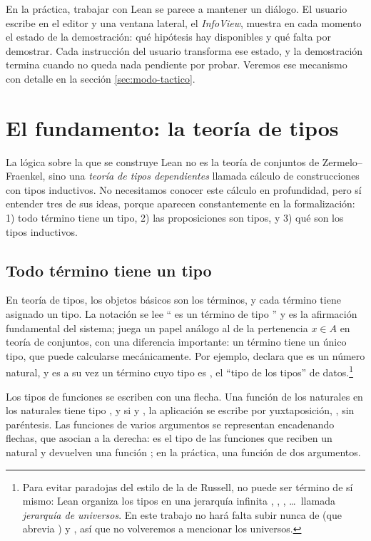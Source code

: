 En la práctica, trabajar con Lean se parece a mantener un diálogo. El usuario escribe en el editor y una ventana lateral, el \emph{InfoView}, muestra en cada momento el estado de la demostración: qué hipótesis hay disponibles y qué falta por demostrar. Cada instrucción del usuario transforma ese estado, y la demostración termina cuando no queda nada pendiente por probar. Veremos ese mecanismo con detalle en la sección \ref{sec:modo-tactico}.
\section{El fundamento: la teoría de tipos}\label{sec:tipos}

La lógica sobre la que se construye Lean no es la teoría de conjuntos de Zermelo--Fraenkel, sino una \emph{teoría de tipos dependientes} llamada cálculo de construcciones con tipos inductivos. No necesitamos conocer este cálculo en profundidad, pero sí entender tres de sus ideas, porque aparecen constantemente en la formalización: 1) todo término tiene un tipo, 2) las proposiciones son tipos, y 3) qué son los tipos inductivos.

\subsection{Todo término tiene un tipo}

En teoría de tipos, los objetos básicos son los términos, y cada término tiene asignado un tipo. La notación  se lee `` es un término de tipo '' y es la afirmación fundamental del sistema; juega un papel análogo al de la pertenencia $x \in A$ en teoría de conjuntos, con una diferencia importante: un término tiene un único tipo, que puede calcularse mecánicamente. Por ejemplo,  declara que  es un número natural, y  es a su vez un término cuyo tipo es , el ``tipo de los tipos'' de datos.\footnote{Para evitar paradojas del estilo de la de Russell,  no puede ser término de sí mismo: Lean organiza los tipos en una jerarquía infinita , , , \dots\ llamada \emph{jerarquía de universos}. En este trabajo no hará falta subir nunca de  (que abrevia ) y , así que no volveremos a mencionar los universos.}

Los tipos de funciones se escriben con una flecha. Una función de los naturales en los naturales tiene tipo , y si  y , la aplicación se escribe por yuxtaposición, , sin paréntesis. Las funciones de varios argumentos se representan encadenando flechas, que asocian a la derecha:  es el tipo de las funciones que reciben un natural y devuelven una función ; en la práctica, una función de dos argumentos.

